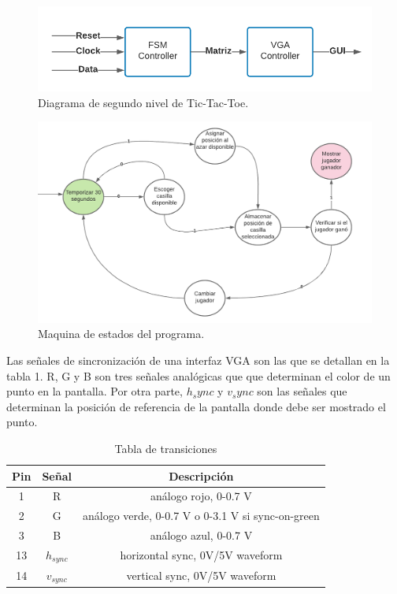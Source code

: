 \documentclass[journal,trans]{IEEEtran}
\begin{document}
	
	\begin{figure}[hbtp]
		\centering
		\includegraphics[width = \columnwidth]{imagenes/SegundoN.png}
		\caption[Figura1]{Diagrama de segundo nivel de Tic-Tac-Toe.}
		\label{fig:SegundoN}
	\end{figure}
	
	
	\begin{figure}[hbtp]
		\centering
		\includegraphics[width = \columnwidth]{imagenes/MaqEst.png}
		\caption[Figura1]{Maquina de estados del programa.}
		\label{fig:MaqEst}
	\end{figure}

	Las señales de sincronización de una interfaz VGA son las que se detallan en la tabla 1. R, G y B son tres señales analógicas que que determinan el color de un punto en la pantalla. Por otra parte, $h_sync$ y $v_sync$ son las señales que determinan la posición de referencia de la pantalla donde debe ser mostrado el punto.
	
	\begin{table}[h]
		\centering
		\begin{tabular}{||c|c|c||}
			\hline
			\hline
			Pin & Señal       & Descripción \\
			\hline
			1   & R           & análogo rojo, 0-0.7 V\\
			2   & G           & análogo verde, 0-0.7 V o 0-3.1 V si sync-on-green \\
			3   & B           & análogo azul, 0-0.7 V\\
			13  & $h_{sync}$  & horizontal sync, 0V/5V waveform\\
			14  & $v_{sync}$  & vertical sync, 0V/5V waveform\\
			\hline
			\hline
		\end{tabular}
		\caption{Tabla de transiciones}
		\label{tab:VGA}
	\end{table}
\end{document}
